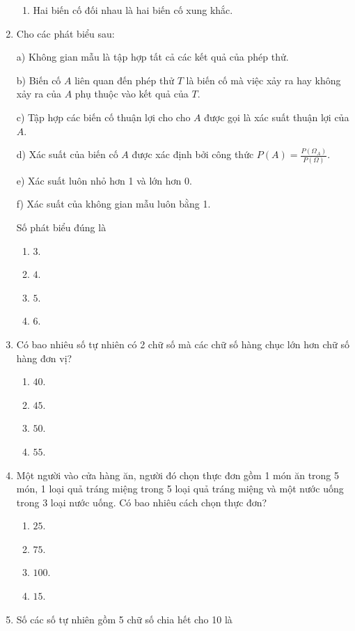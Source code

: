\begin{enumerate}[label=\textbf{Câu \arabic*.},align=left,left=0cm..0cm,itemindent=*]
\begin{enumerate}[label=\textbf{\Alph*.},align=left,left=1cm..0cm,itemindent=*]
		\item Hai biến cố đối nhau là hai biến cố xung khắc.
	\end{enumerate}
	\item Cho các phát biểu sau:\par
	a) Không gian mẫu là tập hợp tất cả các kết quả của phép thử.\par
	b) Biến cố $A$ liên quan đến phép thử $T$ là biến cố mà việc xảy ra hay không xảy ra của $A$ phụ thuộc vào kết quả của $T$.\par
	c) Tập hợp các biến cố thuận lợi cho cho $A$ được gọi là xác suất thuận lợi của $A$.\par
	d) Xác suất của biến cố $A$ được xác định bởi công thức $P(A)=\frac{P(\Omega_A)}{P(\Omega)}$.\par
	e) Xác suất luôn nhỏ hơn 1 và lớn hơn 0.\par
	f) Xác suất của không gian mẫu luôn bằng 1.\par
	Số phát biểu đúng là
	\begin{enumerate}[label=\textbf{\Alph*.},align=left,left=1cm..0cm,itemindent=*]
		\item $3$. \item $4$. \item $5$. \item $6$.
	\end{enumerate}
	\item Có bao nhiêu số tự nhiên có 2 chữ số mà các chữ số hàng chục lớn hơn chữ số hàng đơn vị?
	\begin{enumerate}[label=\textbf{\Alph*.},align=left,left=1cm..0cm,itemindent=*]
		\item $40$. \item $45$. \item $50$. \item $55$.
	\end{enumerate}
	\item Một người vào cửa hàng ăn, người đó chọn thực đơn gồm 1 món ăn trong 5 món, 1 loại quả tráng miệng trong 5 loại quả tráng miệng và một nước uống trong 3 loại nước uống. Có bao nhiêu cách chọn thực đơn?
	\begin{enumerate}[label=\textbf{\Alph*.},align=left,left=1cm..0cm,itemindent=*]
		\item $25$. \item $75$. \item $100$. \item $15$.
	\end{enumerate}
	\item Số các số tự nhiên gồm 5 chữ số chia hết cho 10 là

\end{enumerate}
